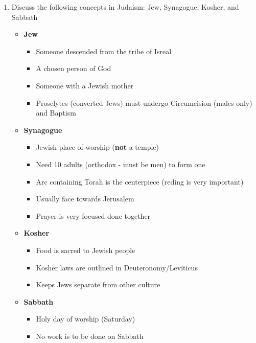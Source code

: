 \documentclass[8pt]{article}
\begin{document}
\begin{enumerate}
        \item Discuss the following concepts in Judaism: Jew, Synagogue, Kosher, and Sabbath
            \begin{itemize}
                \item \textbf{Jew}
                \begin{itemize}
                    \item Someone descended from the tribe of Isreal
                    \item A chosen person of God
                    \item Someone with a Jewish mother
                    \item Proselytes (converted Jews) must undergo Circumcision (males only) and Baptism
                \end{itemize}
                \item \textbf{Synagogue}
                \begin{itemize}
                    \item Jewish place of worship (\textbf{not} a temple)
                    \item Need 10 adults (orthodox - must be men) to form one
                    \item Arc containing Torah is the centerpiece (reding is very important)
                    \item Usually face towards Jerusalem
                    \item Prayer is very focused done together
                \end{itemize}
                \item \textbf{Kosher}
                \begin{itemize}
                    \item Food is sacred to Jewish people
                    \item Kosher laws are outlined in Deuteronomy/Leviticus
                    \item Keeps Jews separate from other culture
                \end{itemize}
                \item \textbf{Sabbath}
                \begin{itemize}
                    \item Holy day of worship (Saturday)
                    \item No work is to be done on Sabbath
                \end{itemize}
            \end{itemize}


\end{enumerate}
\end{document}

